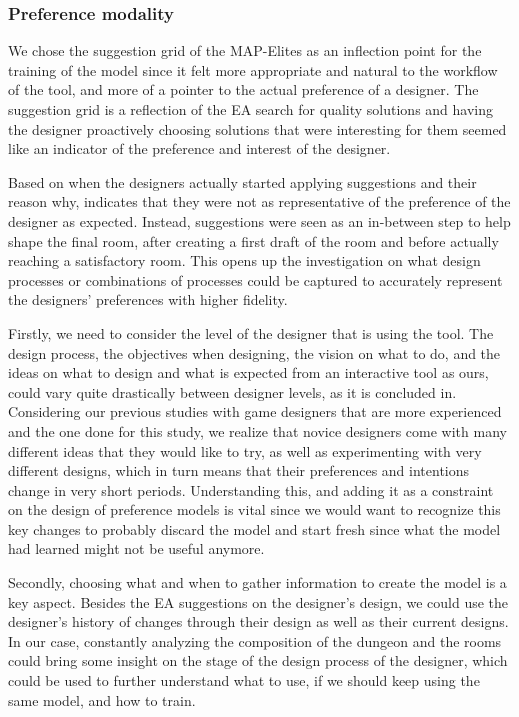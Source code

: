 \subsubsection{Preference modality}

We chose the suggestion grid of the MAP-Elites as an inflection point for the training of the model since it felt more appropriate and natural to the workflow of the tool, and more of a pointer to the actual preference of a designer. The suggestion grid is a reflection of the EA search for quality solutions and having the designer proactively choosing solutions that were interesting for them seemed like an indicator of the preference and interest of the designer.

Based on when the designers actually started applying suggestions and their reason why, indicates that they were not as representative of the preference of the designer as expected. Instead, suggestions were seen as an in-between step to help shape the final room, after creating a first draft of the room and before actually reaching a satisfactory room. This opens up the investigation on what design processes or combinations of processes could be captured to accurately represent the designers’ preferences with higher fidelity. 

Firstly, we need to consider the level of the designer that is using the tool. The design process, the objectives when designing, the vision on what to do, and the ideas on what to design and what is expected from an interactive tool as ours, could vary quite drastically between designer levels, as it is concluded in. Considering our previous studies with game designers that are more experienced and the one done for this study, we realize that novice designers come with many different ideas that they would like to try, as well as experimenting with very different designs, which in turn means that their preferences and intentions change in very short periods. Understanding this, and adding it as a constraint on the design of preference models is vital since we would want to recognize this key changes to probably discard the model and start fresh since what the model had learned might not be useful anymore.

Secondly, choosing what and when to gather information to create the model is a key aspect. Besides the EA suggestions on the designer’s design, we could use the designer’s history of changes through their design as well as their current designs. In our case, constantly analyzing the composition of the dungeon and the rooms could bring some insight on the stage of the design process of the designer, which could be used to further understand what to use, if we should keep using the same model, and how to train. 

